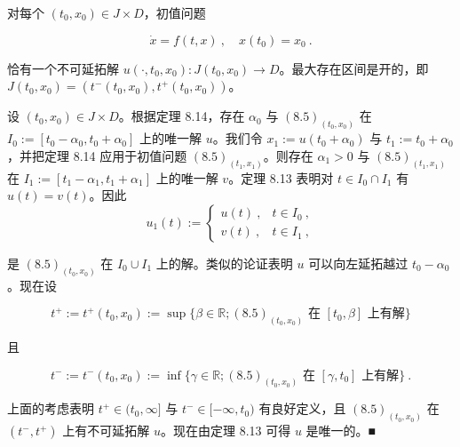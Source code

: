 \begin{theorem}

对每个 $ (t_{0},x_{0})\in J\times D $，初值问题

\[
\dot{x}=f(t,x)\ ,\quad x(t_{0})=x_{0} \ .
\]

恰有一个不可延拓解 $ u(\cdot,t_{0},x_{0}):J(t_{0},x_{0})\to D $。最大存在区间是开的，即 $ J(t_{0},x_{0})=(t^{-}(t_{0},x_{0}),t^{+}(t_{0},x_{0})) $。

\proofhead
设 $ (t_{0},x_{0})\in J\times D $。根据定理 8.14，存在 $ \alpha_{0} $ 与 $ (8.5)_{(t_{0},x_{0})} $ 在 $ I_{0}:=[t_{0}-\alpha_{0},t_{0}+\alpha_{0}] $ 上的唯一解 $ u $。我们令 $ x_{1}:=u(t_{0}+\alpha_{0}) $ 与 $ t_{1}:=t_{0}+\alpha_{0} $，并把定理 8.14 应用于初值问题 $ (8.5)_{(t_{1},x_{1})} $。则存在 $ \alpha_{1}>0 $ 与 $ (8.5)_{(t_{1},x_{1})} $ 在 $ I_{1}:=[t_{1}-\alpha_{1},t_{1}+\alpha_{1}] $ 上的唯一解 $ v $。定理 8.13 表明对 $ t\in I_{0}\cap I_{1} $ 有 $ u(t)=v(t) $。因此
\begin{equation*}
u_{1}(t):=\begin{cases}u(t)\ , & t\in I_{0}\ ,\\ v(t)\ , & t\in I_{1}\ ,\end{cases}
\end{equation*}

是 $ (8.5)_{(t_{0},x_{0})} $ 在 $ I_{0}\cup I_{1} $ 上的解。类似的论证表明 $ u $ 可以向左延拓越过 $ t_{0}-\alpha_{0} $。现在设

\[
t^{+}:=t^{+}(t_{0},x_{0}):=\sup\{\beta\in\mathbb{R};(8.5)_{(t_{0},x_{0})}\text{ 在 }[t_{0},\beta]\text{ 上有解}\}
\]

且

\[
t^{-}:=t^{-}(t_{0},x_{0}):=\inf\{\gamma\in\mathbb{R};(8.5)_{(t_{0},x_{0})}\text{ 在 }[\gamma,t_{0}]\text{ 上有解}\} \ .
\]

上面的考虑表明 $ t^{+}\in(t_{0},\infty] $ 与 $ t^{-}\in[-\infty,t_{0}) $ 有良好定义，且 $ (8.5)_{(t_{0},x_{0})} $ 在 $ (t^{-},t^{+}) $ 上有不可延拓解 $ u $。现在由定理 8.13 可得 $ u $ 是唯一的。\nobreak\hspace{0.35em}■

\end{theorem}

